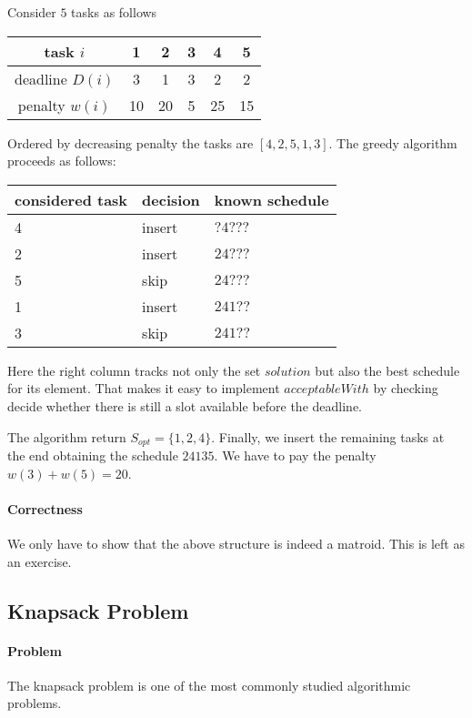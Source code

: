 \begin{example}
Consider $5$ tasks as follows
\begin{center}
\begin{tabular}{c|ccccc}
task $i$ & 1 & 2 & 3 & 4 & 5 \\
\hline
deadline $D(i)$ & 3 & 1 & 3 & 2 & 2 \\
penalty $w(i)$ & 10 & 20 & 5 & 25 & 15
\end{tabular}
\end{center}

Ordered by decreasing penalty the tasks are $[4,2,5,1,3]$.
The greedy algorithm proceeds as follows:
\begin{center}
\begin{tabular}{|lll|}
\hline
considered task & decision & known schedule \\
\hline
4 & insert & $?4???$ \\
2 & insert & $24???$ \\
5 & skip   & $24???$ \\
1 & insert & $241??$ \\
3 & skip   & $241??$ \\
\hline
\end{tabular}
\end{center}
Here the right column tracks not only the set $solution$ but also the best schedule for its element.
That makes it easy to implement $acceptableWith$ by checking decide whether there is still a slot available before the deadline.

The algorithm return $S_{opt}=\{1,2,4\}$.
Finally, we insert the remaining tasks at the end obtaining the schedule $24135$.
We have to pay the penalty $w(3)+w(5)=20$.
\end{example}


\paragraph{Correctness}
We only have to show that the above structure is indeed a matroid.
This is left as an exercise.

\subsection{Knapsack Problem}\label{sec:ad:greedy:knapsack}

\paragraph{Problem}
The knapsack problem is one of the most commonly studied algorithmic problems.

